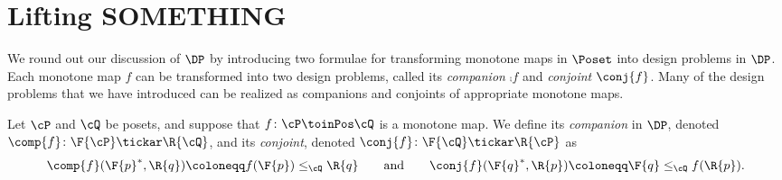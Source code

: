 \section{Lifting SOMETHING}
We round out our discussion of $\DP$ by introducing two formulae for transforming monotone maps in $\Poset$ into design problems in $\DP$. Each monotone map $f$ can be transformed into two design problems, called its \emph{companion} $\comp{f}$ and \emph{conjoint} $\conj{f}$. Many of the design problems that we have introduced can be realized as companions and conjoints of appropriate monotone maps.

\begin{definition}
\label{def:comp_conj}
Let $\cP $ and $\cQ $ be posets, and suppose that $f\colon\cP \toinPos \cQ $ is a monotone map. We define its \emph{companion} in $\DP$, denoted $\comp{f}\colon \F{\cP} \tickar \R{\cQ}$,
and its \emph{conjoint}, denoted $\conj{f}\colon \F{\cQ} \tickar \R{\cP}$ as
\begin{equation}
\comp{f}(\F{p}^*,\R{q})\coloneqq f(\F{p}) \leq_\cQ \R{q}
\qquad\text{and}\qquad
\conj{f}(\F{q}^*,\R{p})\coloneqq \F{q} \leq_\cQ f(\R{p}).
\end{equation}
\end{definition}

